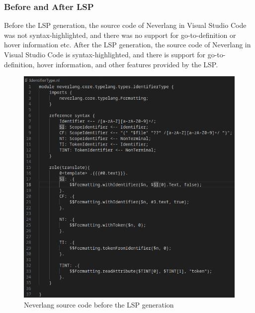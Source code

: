 \subsubsection{Before and After LSP}\label{sec:neverlang-before-after-lsp}

Before the LSP generation, the source code of Neverlang in Visual Studio Code was not syntax-highlighted, and there was no support for go-to-definition or hover information etc. After the LSP generation, the source code of Neverlang in Visual Studio Code is syntax-highlighted, and there is support for go-to-definition, hover information, and other features provided by the LSP.

\begin{figure}[h!]
    \centering
    \begin{minipage}{0.45\textwidth}
        \centering
        \includegraphics[width=\linewidth]{./imgs/neverlang-lsp-before.png}
        \caption{Neverlang source code before the LSP generation}
    \end{minipage}\hfill
    \begin{minipage}{0.45\textwidth}
        \centering

\end{minipage}
\end{figure}
